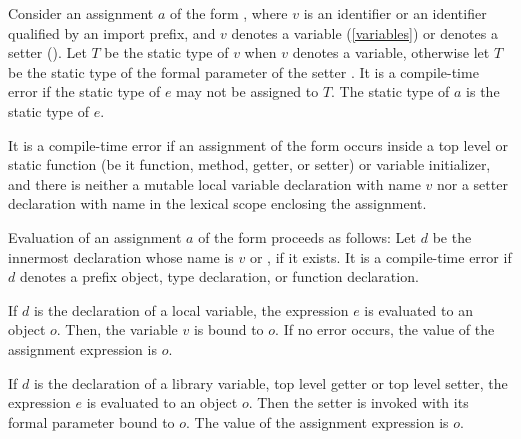 \documentclass[makeidx]{article}
\begin{document}
\LMHash{}%
Consider an assignment $a$ of the form ,
where $v$ is an identifier or an identifier qualified by an import prefix,
and $v$ denotes a variable (\ref{variables}) or  denotes a setter
().
Let $T$ be the static type of $v$ when $v$ denotes a variable,
otherwise let $T$ be the static type of the formal parameter of the setter .
It is a compile-time error if the static type of $e$ may not be assigned to $T$.
The static type of $a$ is the static type of $e$.

\LMHash{}%
It is a compile-time error if an assignment of the form  occurs
inside a top level or static function (be it function, method, getter, or setter) or variable initializer,
and there is neither a mutable local variable declaration with name $v$
nor a setter declaration with name  in the lexical scope enclosing the assignment.

\LMHash{}%
Evaluation of an assignment $a$ of the form 
proceeds as follows:
Let $d$ be the innermost declaration whose name is $v$ or , if it exists.
It is a compile-time error if $d$ denotes
a prefix object, type declaration, or function declaration.

\LMHash{}%
If $d$ is the declaration of a local variable, the expression $e$ is evaluated to an object $o$.
Then, the variable $v$ is bound to $o$.
If no error occurs, the value of the assignment expression is $o$.



\LMHash{}%
If $d$ is the declaration of a library variable, top level getter or top level setter, the expression $e$ is evaluated to an object $o$.
Then the setter  is invoked with its formal parameter bound to $o$.
The value of the assignment expression is $o$.
\end{document}
